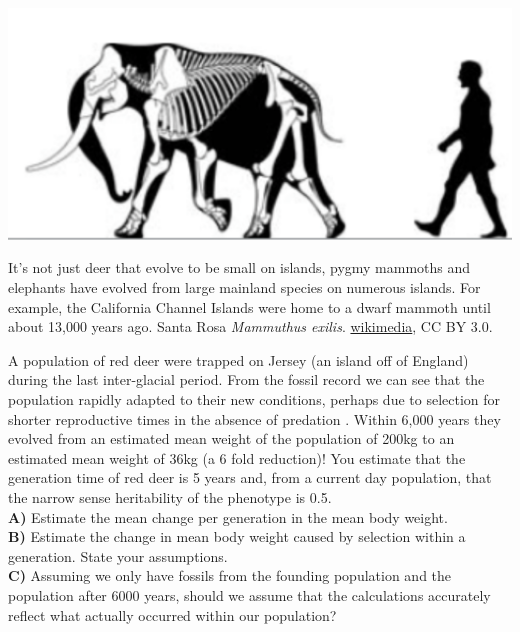 

 \begin{marginfigure}
 \begin{center}
 \includegraphics[width=\textwidth]{illustration_images/Quant_gen/dwarf_elephant/M_exilis_skeletal.pdf} \end{center}
 \caption{It's not just deer that evolve to be small on islands,
  pygmy mammoths and elephants have evolved from large mainland species
  on numerous islands. For example, the
   California Channel Islands were home to a dwarf mammoth until about 13,000 years
   ago. \newline \noindent \tiny{Santa
   Rosa {\it Mammuthus exilis}. \href{https://en.wikipedia.org/wiki/Pygmy_mammoth\#/media/File:M._exilis_skeletal.png}{wikimedia}, CC BY 3.0.} }\label{Fig:Pygmy_mammoth}
 \end{marginfigure}
\begin{question}{} \label{question:reddeer}
A population of red deer were trapped on Jersey (an island off of
England) during the last inter-glacial period. From the fossil record 
we can see that the population rapidly adapted to their new
conditions, perhaps due to selection for shorter reproductive times in
the absence of predation \citep{lister:89}. Within 6,000 years they evolved from an estimated mean weight of
the population of 200kg to an estimated mean weight of 36kg (a 6 fold
reduction)! You estimate that the generation time
of red deer is 5 years and, from a current day population, that the narrow sense heritability of the
phenotype is 0.5.\\

{\bf A)}	Estimate the mean change per generation in the mean body weight. \\

{\bf B)}	Estimate the change in mean body weight caused by
selection within a generation. State your assumptions.\\

{\bf C)}	Assuming we only have fossils from the founding population and the population after 6000 years, should we assume that the calculations accurately reflect what actually occurred within our population?
\end{question}


